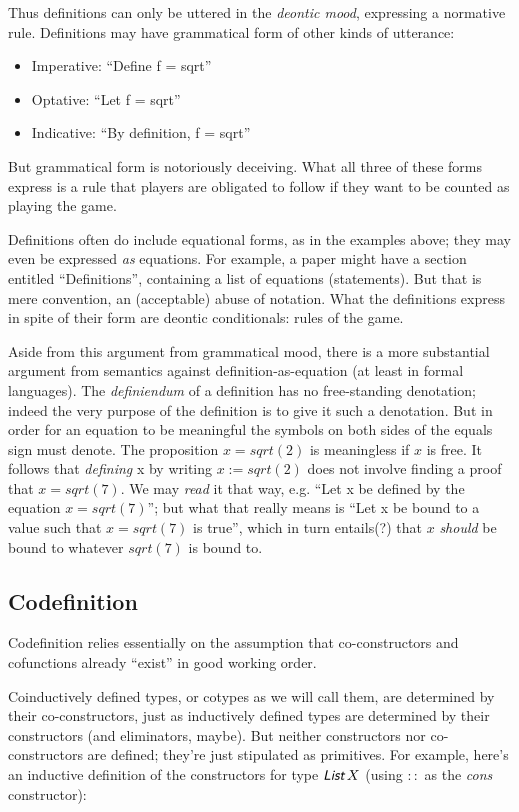 \documentclass{article}
\begin{document}
Thus definitions can only be uttered in the \textit{deontic mood},
expressing a normative rule. Definitions may have grammatical form of
other kinds of utterance:

\begin{itemize}
\item Imperative: ``Define f = sqrt''
\item Optative: ``Let  f = sqrt''
\item Indicative: ``By definition, f = sqrt''
\end{itemize}

But grammatical form is notoriously deceiving. What all three of these
forms express is a rule that players are obligated to follow if they
want to be counted as playing the game.

Definitions often do include equational forms, as in the examples
above; they may even be expressed \textit{as} equations. For example,
a paper might have a section entitled ``Definitions'', containing a
list of equations (statements). But that is mere convention, an
(acceptable) abuse of notation. What the definitions express in spite
of their form are deontic conditionals: rules of the game.

Aside from this argument from grammatical mood, there is a more
substantial argument from semantics against definition-as-equation (at
least in formal languages). The \textit{definiendum} of a definition
has no free-standing denotation; indeed the very purpose of the
definition is to give it such a denotation. But in order for an
equation to be meaningful the symbols on both sides of the equals sign
must denote. The proposition \(x = sqrt(2)\) is meaningless if \(x\)
is free. It follows that \textit{defining} x by writing \(x :=
sqrt(2)\) does not involve finding a proof that \(x = sqrt(7)\). We
may \textit{read} it that way, e.g. ``Let x be defined by the equation
\(x = sqrt(7)\)''; but what that really means is ``Let x be bound to a
value such that \(x = sqrt(7)\) is true'', which in turn entails(?)
that \(x\) \textit{should} be bound to whatever \(sqrt(7)\) is bound
to.

\subsection{Codefinition}

Codefinition relies essentially on the assumption that co-constructors
and cofunctions already ``exist'' in good working order.

Coinductively defined types, or cotypes as we will call them, are
determined by their co-constructors, just as inductively defined types
are determined by their constructors (and eliminators, maybe). But
neither constructors nor co-constructors are defined; they're just
stipulated as primitives. For example, here's an inductive definition
of the constructors for type \(\List\, X\) (using \(\mathpunct{::}\)
as the \textit{cons} constructor):
\end{document}
